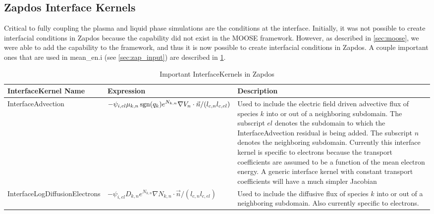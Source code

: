\subsection{Zapdos Interface Kernels}
\label{sec:zap_interface}

Critical to fully coupling the plasma and liquid phase simulations are the conditions at the interface. Initially, it was not possible to create interfacial conditions in Zapdos because the capability did not exist in the MOOSE framework. However, as described in \cref{sec:moose}, we were able to add the capability to the framework, and thus it is now possible to create interfacial conditions in Zapdos. A couple important ones that are used in mean\_en.i (see \cref{sec:zap_input}) are described in \cref{tab:interface}.

\begin{ThreePartTable}

  \begin{TableNotes}
  \end{TableNotes}

  \begin{longtable}{>{\centering}m{2in}| >{\centering}m{2in}| >{\raggedright\arraybackslash}m{2in}}
    \textbf{InterfaceKernel Name} & \textbf{Expression} & \textbf{Description}\\\hline\hline
    \endhead
    \caption{Important InterfaceKernels in Zapdos}
    \endfoot
    \caption{Important InterfaceKernels in Zapdos}
    \label{tab:interface}
    \endlastfoot

    InterfaceAdvection & \(\displaystyle -\psi_{i,el}\mu_{k,n}\operatorname{sgn}(q_k) e^{N_{k,n}}\nabla V_n \cdot \vec{n} / (l_{c,n}l_{c,el})\) & Used to include the electric field driven advective flux of species $k$ into or out of a neighboring subdomain. The subscript $el$ denotes the subdomain to which the InterfaceAdvection residual is being added. The subscript $n$ denotes the neighboring subdomain. Currently this interface kernel is specific to electrons because the transport coefficients are assumed to be a function of the mean electron energy. A generic interface kernel with constant transport coefficients will have a much simpler Jacobian\\\hline
    InterfaceLogDiffusionElectrons & \(\displaystyle -\psi_{i,el} D_{k,n} e^{N_{k,n}} \nabla N_{k,n} \cdot \vec{n} / (l_{c,n}l_{c,el})\) & Used to include the diffusive flux of species $k$ into or out of a neighboring subdomain. Also currently specific to electrons.\\\hline
  \end{longtable}
\end{ThreePartTable}

